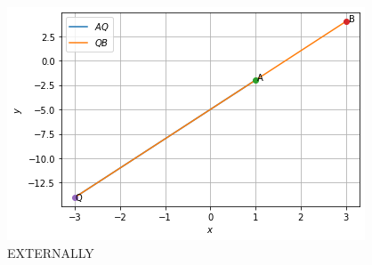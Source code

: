 \begin{enumerate}
\begin{figure}[!ht]
    \centering
\includegraphics[width=\columnwidth]{solutions/su2021/2/26/externally.png}
    \caption{EXTERNALLY}
    \label{vec/2/26/fig:EXTERNALLY.}
\end{figure}  
\end{enumerate}
